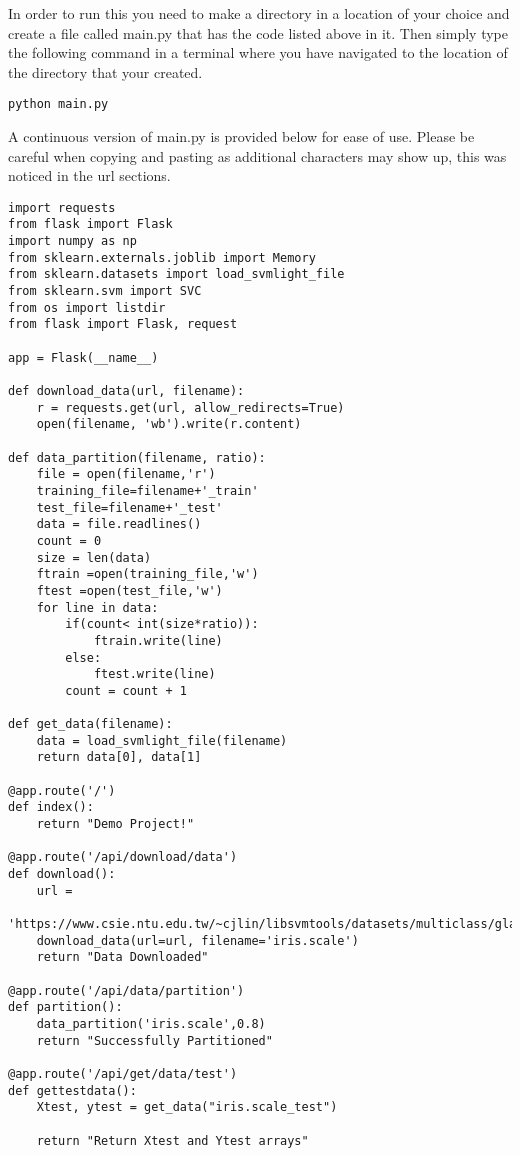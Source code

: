In order to run this you need to make a directory in a location of
your choice and create a file called main.py that has the code listed
above in it. Then simply type the following command in a terminal
where you have navigated to the location of the directory that your
created. 

\begin{lstlisting}
python main.py
\end{lstlisting} 
 
A continuous version of main.py is provided below for ease of
use. Please be careful when copying and pasting as additional
characters may show up, this was noticed in the url sections. 

\begin{lstlisting}
import requests
from flask import Flask
import numpy as np
from sklearn.externals.joblib import Memory
from sklearn.datasets import load_svmlight_file
from sklearn.svm import SVC
from os import listdir
from flask import Flask, request

app = Flask(__name__)

def download_data(url, filename):
    r = requests.get(url, allow_redirects=True)
    open(filename, 'wb').write(r.content)

def data_partition(filename, ratio):
    file = open(filename,'r')
    training_file=filename+'_train'
    test_file=filename+'_test'
    data = file.readlines()
    count = 0
    size = len(data)
    ftrain =open(training_file,'w')
    ftest =open(test_file,'w')
    for line in data:
        if(count< int(size*ratio)):
            ftrain.write(line)
        else:
            ftest.write(line)
        count = count + 1        

def get_data(filename):
    data = load_svmlight_file(filename)
    return data[0], data[1]

@app.route('/')
def index():
    return "Demo Project!"

@app.route('/api/download/data')
def download():
    url =
    'https://www.csie.ntu.edu.tw/~cjlin/libsvmtools/datasets/multiclass/glass.scale'
    download_data(url=url, filename='iris.scale')
    return "Data Downloaded"

@app.route('/api/data/partition')
def partition():
    data_partition('iris.scale',0.8)
    return "Successfully Partitioned"

@app.route('/api/get/data/test')
def gettestdata():
    Xtest, ytest = get_data("iris.scale_test")
    
    return "Return Xtest and Ytest arrays"


\end{lstlisting}
